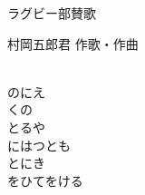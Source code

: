 \documentclass[10pt,b5j]{tarticle} %
\begin{document}
\begin{minipage}[c]{0.7\hsize} %
    \begin{center}
        {\LARGE
            ラグビー部賛歌 %
        }
        {\small 
        }
    \end{center}
\end{minipage}
\begin{minipage}[c]{0.3\hsize} %
    \begin{flushright} %
        村岡五郎君 作歌・作曲 %
    \end{flushright}
\end{minipage}

\vspace{1.5em} %
\newcommand{\linespace}{0.5em} %
\newcommand{\blocksize}{0.5\hsize} %
\newcommand{\itemmargin}{3em} %
\begin{enumerate} %
    \setlength{\itemindent}{\itemmargin} %
    \begin{minipage}[c]{\blocksize}
    
        \vspace{\linespace}
        \item[]~\\
        のにえ\\
        くの\\
        とるや\\
        にはつとも\\
        とにき\\
        をひてをける
    
    \end{minipage}
\end{enumerate} %
\end{document}
